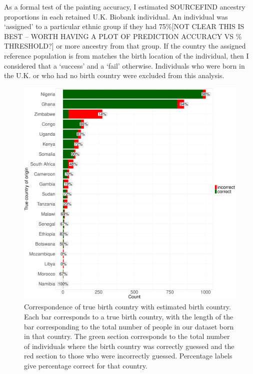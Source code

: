 As a formal test of the painting accuracy, I estimated SOURCEFIND ancestry proportions in each retained U.K. Biobank individual. An individual was `assigned' to a particular ethnic group if they had {\color{red}75\%[NOT CLEAR THIS IS BEST -- WORTH HAVING A PLOT OF PREDICTION ACCURACY VS \% THRESHOLD?]} or more ancestry from that group. If the country the assigned reference population is from matches the birth location of the individual, then I considered that a `success' and a `fail' otherwise. Individuals who were born in the U.K. or who had no birth country were excluded from this analysis. 

\begin{figure}[htp]
    \centering
    \includegraphics[width=1.0\textwidth]{../images/chapter3/country_of_origin_allInds.pdf}
    \caption{Correspondence of true birth country with estimated birth country. Each bar corresponds to a true birth country, with the length of the bar corresponding to the total number of people in our dataset born in that country. The green section corresponds to the total number of individuals where the birth country was correctly guessed and the red section to those who were incorrectly guessed. Percentage labels give percentage correct for that country.}
    \label{fig:country_of_origin_allInds}
\end{figure}

